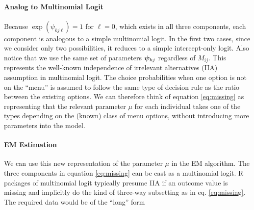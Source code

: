 \documentclass[11pt]{article}
\begin{document}
\paragraph{Analog to Multinomial Logit} Because \(\exp(\psi_{kj\ell}) = 1\) for \(\ell = 0\), which exists in all three components, each component is analogous to a simple multinomial logit. In the first two cases, since we consider only two possibilities, it reduces to a simple intercept-only logit. Also notice that we use the same set of parameters \(\bm{\psi}_{kj}\) regardless of \(M_{ij}\). This represents the well-known independence of irrelevant alternatives (IIA) assumption in multinomial logit. The choice probabilities when one option is not on the ``menu'' is assumed to follow the same type of decision rule as the ratio between the existing options.  We can therefore think of equation \ref{eq:missing} as representing that the relevant parameter \(\mu\) for each individual takes one of the types depending on the (known) class of menu options, without introducing more parameters into the model.

\paragraph{EM Estimation} We can use this new representation of the parameter \(\mu\) in the EM algorithm. The three components in equation \ref{eq:missing} can be cast as a multinomial logit. R packages of multinomial logit typically presume IIA if an outcome value is missing and implicitly do the kind of three-way subsetting as in eq. \ref{eq:missing}. The required data would be of the ``long'' form
\end{document}
